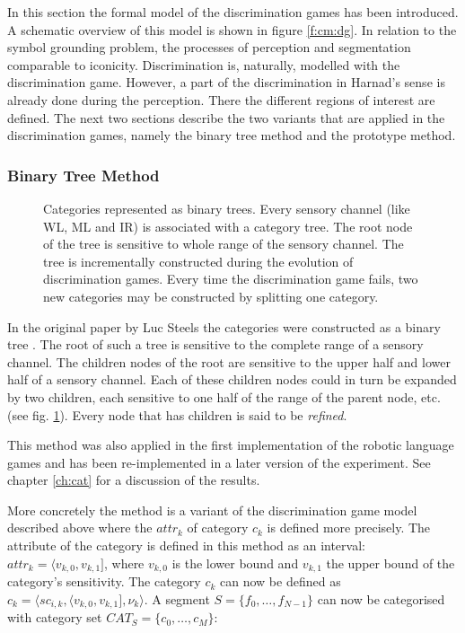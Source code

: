 \p
In this section the formal model of the discrimination games has been introduced. A schematic overview of this model is shown in figure \ref{f:cm:dg}. In relation to the symbol grounding problem, the processes of perception and segmentation comparable to iconicity. Discrimination is, naturally, modelled with the discrimination game. However, a part of the discrimination in Harnad's sense is already done during the perception. There the different regions of interest are defined. The next two sections describe the two variants that are applied in the discrimination games, namely the binary tree method and the prototype method.

\subsubsection{Binary Tree Method}\label{s:cm:binary}

\begin{figure}[t]
\centerline{}
\caption{Categories represented as binary trees. Every sensory channel (like WL, ML and IR) is associated with a category tree. The root node of the tree is sensitive to whole range of the sensory channel. The tree is incrementally constructed during the evolution of discrimination games. Every time the discrimination game fails, two new categories may be constructed by splitting one category.}
\label{f:cm:binary_tree}
\end{figure}

In the original paper by Luc Steels the categories were constructed as a binary tree \cite{steels:1996b}. The root of such a tree is sensitive to the complete range of a sensory channel. The children nodes of the root are sensitive to the upper half and lower half of a sensory channel. Each of these children nodes could in turn be expanded by two children, each sensitive to one half of the range of the parent node, etc. (see fig. \ref{f:cm:binary_tree}). Every node that has children is said to be {\em refined}.

This method was also applied in the first implementation of the robotic language games \cite{steelsvogt:1997,vogt:1998a} and has been re-implemented in a later version of the experiment. See chapter \ref{ch:cat} for a discussion of the results.

More concretely the method is a variant of the discrimination game model described above where the $attr_k$ of category $c_k$ is defined more precisely. The attribute of the category is defined in this method as an interval: $attr_k=\langle v_{k,0},v_{k,1}]$, where $v_{k,0}$ is the lower bound and $v_{k,1}$ the upper bound of the category's sensitivity. The category $c_k$ can now be defined as $c_k=\langle sc_{i,k},\langle v_{k,0},v_{k,1}],\nu_k\rangle$. A segment $S=\{f_0,\ldots,f_{N-1}\}$ can now be categorised with category set $CAT_S=\{c_0,\ldots,c_M\}$:

